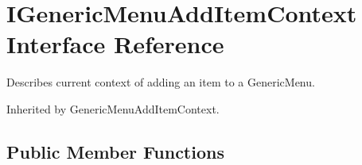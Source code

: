 \hypertarget{interface_i_generic_menu_add_item_context}{}\section{I\+Generic\+Menu\+Add\+Item\+Context Interface Reference}
\label{interface_i_generic_menu_add_item_context}


Describes current context of adding an item to a Generic\+Menu.  




Inherited by Generic\+Menu\+Add\+Item\+Context.

\subsection*{Public Member Functions}
